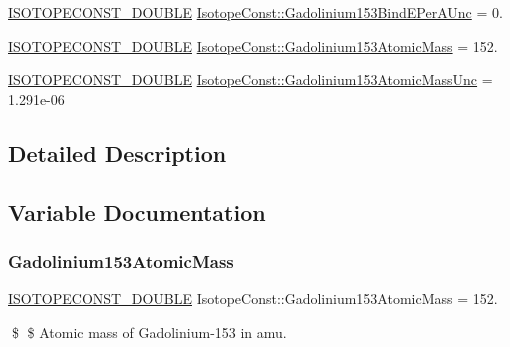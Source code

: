 \begin{DoxyCompactItemize}
\item 
\mbox{\hyperlink{group___isotope_const-_macros_ga8f45a7272ce02c0b4c65c44636ed719a}{I\+S\+O\+T\+O\+P\+E\+C\+O\+N\+S\+T\+\_\+\+D\+O\+U\+B\+LE}} \mbox{\hyperlink{group___isotope_const-_gadolinium-_gd153_ga9b5dbb4516bf628576a2094bf702f7f0}{Isotope\+Const\+::\+Gadolinium153\+Bind\+E\+Per\+A\+Unc}} = 0.
\item 
\mbox{\hyperlink{group___isotope_const-_macros_ga8f45a7272ce02c0b4c65c44636ed719a}{I\+S\+O\+T\+O\+P\+E\+C\+O\+N\+S\+T\+\_\+\+D\+O\+U\+B\+LE}} \mbox{\hyperlink{group___isotope_const-_gadolinium-_gd153_ga7517274ee5f53479685a25121f7d2ff3}{Isotope\+Const\+::\+Gadolinium153\+Atomic\+Mass}} = 152.
\item 
\mbox{\hyperlink{group___isotope_const-_macros_ga8f45a7272ce02c0b4c65c44636ed719a}{I\+S\+O\+T\+O\+P\+E\+C\+O\+N\+S\+T\+\_\+\+D\+O\+U\+B\+LE}} \mbox{\hyperlink{group___isotope_const-_gadolinium-_gd153_ga6d505327717c18147081885015bd458e}{Isotope\+Const\+::\+Gadolinium153\+Atomic\+Mass\+Unc}} = 1.\+291e-\/06
\end{DoxyCompactItemize}


\subsection{Detailed Description}


\subsection{Variable Documentation}
\mbox{\label{group___isotope_const-_gadolinium-_gd153_ga7517274ee5f53479685a25121f7d2ff3}} 
\subsubsection{\texorpdfstring{Gadolinium153\+Atomic\+Mass}{Gadolinium153AtomicMass}}
{\footnotesize\ttfamily \mbox{\hyperlink{group___isotope_const-_macros_ga8f45a7272ce02c0b4c65c44636ed719a}{I\+S\+O\+T\+O\+P\+E\+C\+O\+N\+S\+T\+\_\+\+D\+O\+U\+B\+LE}} Isotope\+Const\+::\+Gadolinium153\+Atomic\+Mass = 152.}

\$ \$ Atomic mass of Gadolinium-\/153 in amu. \mbox{\label{group___isotope_const-_gadolinium-_gd153_ga6d505327717c18147081885015bd458e}} 
